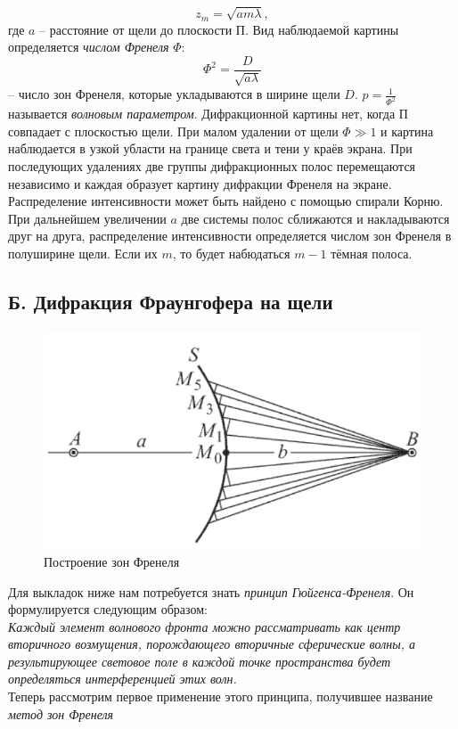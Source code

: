 \documentclass[a4paper,12pt]{report}
\begin{document}
\begin{equation}
z_m = \sqrt{am\lambda},
\end{equation}
где $a$ -- расстояние от щели до плоскости П. Вид наблюдаемой картины определяется \textit{числом Френеля} $\Phi$:
$$
\Phi^2 = \dfrac{D}{\sqrt{a\lambda}}
$$
-- число зон Френеля, которые укладываются в ширине щели $D$. $p = \frac{1}{\Phi^2}$ называется \textit{волновым параметром}. Дифракционной картины нет, когда П совпадает с плоскостью щели. При малом удалении от щели $\Phi \gg 1$ и картина наблюдается в узкой убласти на границе света и тени у краёв экрана. При последующих удалениях две группы дифракционных полос перемещаются независимо и каждая образует картину дифракции Френеля на экране. Распределение интенсивности может быть найдено с помощью спирали Корню. При дальнейшем увеличении $a$ две системы полос сближаются и накладываются друг на друга, распределение интенсивности определяется числом зон Френеля в полуширине щели. Если их $m$, то будет набюдаться $m-1$ тёмная полоса.
\subsection*{Б. Дифракция Фраунгофера на щели}
\begin{figure}
  \begin{center}
    \includegraphics[width = 1\textwidth]{2.png}
  \end{center}
  \caption{Построение зон Френеля}
  \vspace{+5pt}
\end{figure}
Для выкладок ниже нам потребуется знать \textit{принцип Гюйгенса-Френеля}. Он формулируется следующим образом:\\
\textit{Каждый элемент волнового фронта можно рассматривать как центр  вторичного возмущения, порождающего вторичные сферические волны, а результирующее световое поле  в каждой точке пространства будет определяться интерференцией этих волн.}\\
Теперь рассмотрим первое применение этого принципа, получившее название \textit{метод зон Френеля}
\end{document}
